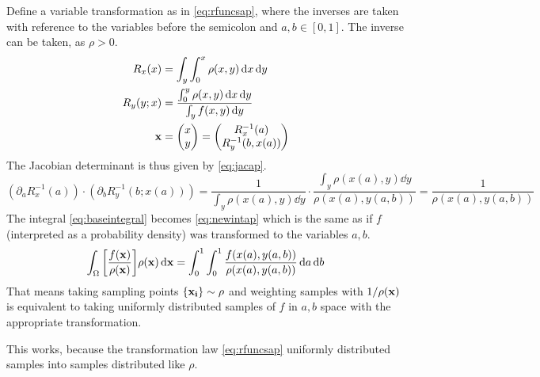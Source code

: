 Define a variable transformation as in \cref{eq:rfuncsap}, where the
inverses are taken with reference to the variables before the
semicolon and \(a,b\in [0, 1]\). The inverse can be taken, as
\(\rho > 0\).
%
\begin{equation}
  \label{eq:rfuncsap}
  \begin{split}
  R_x(x) &= \int_y\int_0^x\rho(x, y) \dd{x}\dd{y} \\
  R_y(y; x) &= \frac{\int_0^y\rho(x, y) \dd{x}\dd{y}}{\int_y
              f(x,y)\dd{y}} \\
  \vb{x} &= \mqty(x \\ y) = \mqty(R_x^{-1}(a) \\ R_y^{-1}(b, x(a)))
  \end{split}
\end{equation}
%
The Jacobian determinant is thus given by \cref{eq:jacap}.
\begin{equation}
  \label{eq:jacap}
  (\partial_a R_x^{-1}(a))\cdot (\partial_b R_y^{-1}(b; x(a))) =
  \frac{1}{\int_y\rho(x(a), y)\dd{y}}\cdot \frac{\int_y\rho(x(a),
    y)\dd{y}}{\rho(x(a), y(a, b))} = \frac{1}{\rho(x(a), y(a, b))}
\end{equation}
%
The integral \cref{eq:baseintegral} becomes \cref{eq:newintap} which
is the same as if \(f\) (interpreted as a probability density) was
transformed to the variables \(a, b\).
%
\begin{equation}
  \label{eq:newintap}
  \int_\Omega
  \qty[\frac{f(\vb{x})}{\rho(\vb{x})}] \rho(\vb{x}) \dd{\vb{x}} =
  \int_0^1\int_0^1 \frac{f(x(a), y(a,b))}{\rho(x(a), y(a, b))} \dd{a}\dd{b}
\end{equation}
%
That means taking sampling points \(\{\vb{x_i}\}\sim \rho\) and
weighting samples with \(1/\rho(\vb{x})\) is equivalent to taking
uniformly distributed samples of \(f\) in \(a,b\) space with the
appropriate transformation.

This works, because the transformation law \cref{eq:rfuncsap}
uniformly distributed samples into samples distributed like \(\rho\).

